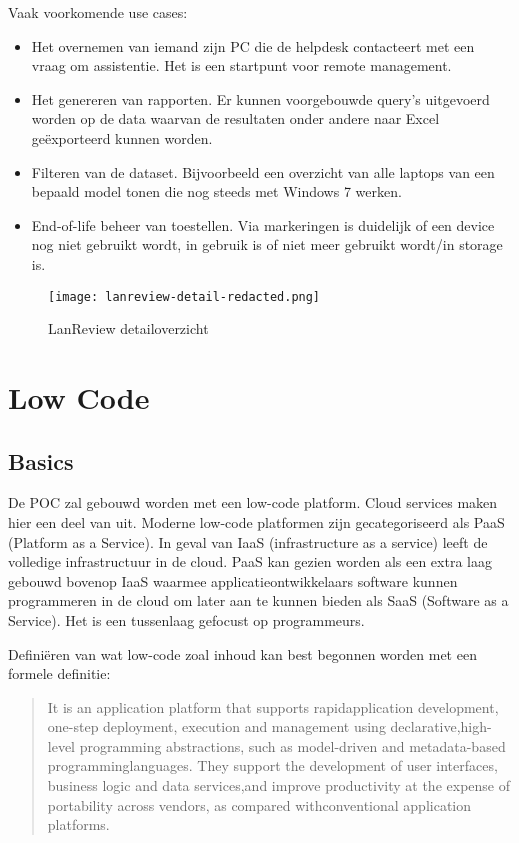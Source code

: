 Vaak voorkomende use cases:
\begin{itemize}
    \item Het overnemen van iemand zijn PC die de helpdesk contacteert met een vraag om assistentie. Het is een startpunt voor remote management.
    \item Het genereren van rapporten. Er kunnen voorgebouwde query's uitgevoerd worden op de data waarvan de resultaten onder andere naar Excel geëxporteerd kunnen worden.
    \item Filteren van de dataset. Bijvoorbeeld een overzicht van alle laptops van een bepaald model tonen die nog steeds met Windows 7 werken.
    \item End-of-life beheer van toestellen. Via markeringen is duidelijk of een device nog niet gebruikt wordt, in gebruik is of niet meer gebruikt wordt/in storage is.
\end{itemize}


\begin{figure}[h!]
    \texttt{[image: lanreview-detail-redacted.png]}
    \caption{LanReview detailoverzicht}
    \label{fig:lr-detail}
\end{figure}

\section{Low Code}

\subsection{Basics}

De POC zal gebouwd worden met een low-code platform. Cloud services maken hier een deel van uit. Moderne low-code platformen zijn gecategoriseerd als PaaS (Platform as a Service). In geval van IaaS (infrastructure as a service) leeft de volledige infrastructuur in de cloud. PaaS kan gezien worden als een extra laag gebouwd bovenop IaaS waarmee applicatieontwikkelaars software kunnen programmeren in de cloud om later aan te kunnen bieden als SaaS (Software as a Service). Het is een tussenlaag gefocust op programmeurs. \autocite{Nucleus2017}

Definiëren van wat low-code zoal inhoud kan best begonnen worden met een formele definitie:
\begin{quote}
    It is an application platform that supports rapidapplication development, one-step deployment, execution and management using declarative,high-level programming abstractions, such as model-driven and metadata-based programminglanguages. They support the development of user interfaces, business logic and data services,and improve productivity at the expense of portability across vendors, as compared withconventional application platforms.\\ \autocite{Vincent2019}
\end{quote}

